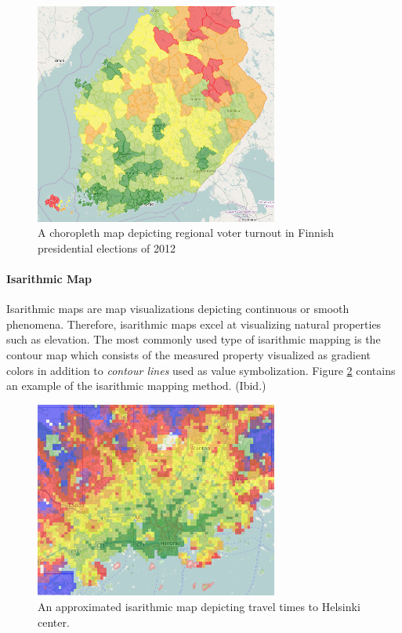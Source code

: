 \begin{figure}[htbp]
  \begin{center}
    \includegraphics[width=8cm]{images/choropleth-example.png}
    \caption{A choropleth map depicting regional voter turnout in Finnish presidential elections of 2012}
    \label{fig:choropleth}
  \end{center}
\end{figure}

\paragraph{Isarithmic Map}

Isarithmic maps are map visualizations depicting continuous or smooth phenomena. Therefore, isarithmic maps excel at visualizing natural properties such as elevation. The most commonly used type of isarithmic mapping is the contour map which consists of the measured property visualized as gradient colors in addition to \emph{contour lines} used as value symbolization. Figure \ref{fig:isarithmic} contains an example of the isarithmic mapping method. (Ibid.)

\begin{figure}[htbp]
  \begin{center}
    \includegraphics[width=8cm]{images/isarithmic-example.png}
    \caption{An approximated isarithmic map depicting travel times to Helsinki center.}
    \label{fig:isarithmic}
  \end{center}
\end{figure}

